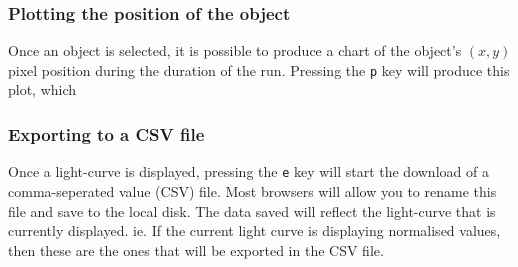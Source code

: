 \subsubsection{Plotting the position of the object}
Once an object is selected, it is possible to produce a chart of the object's $(x, y)$ pixel position during the duration of the run. Pressing the \texttt{p} key will produce this plot, which 

\subsubsection{Exporting to a CSV file}
Once a light-curve is displayed, pressing the \texttt{e} key will start the download of a comma-seperated value (CSV) file. Most browsers will allow you to rename this file and save to the local disk. The data saved will reflect the light-curve that is currently displayed. ie. If the current light curve is displaying normalised values, then these are the ones that will be exported in the CSV file.